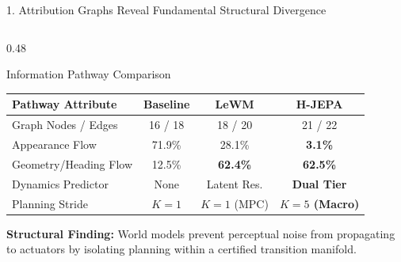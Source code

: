 \documentclass[aspectratio=169, 10pt]{beamer}
\begin{document}
\begin{frame}{1. Attribution Graphs Reveal Fundamental Structural Divergence}
\begin{columns}[T]
    \begin{column}{0.48\textwidth}
      \begin{block}{Information Pathway Comparison}
        \scriptsize
        \centering
        \setlength{\tabcolsep}{3pt}
        \begin{tabular}{lccc}
          \toprule
          \textbf{Pathway Attribute} & \textbf{Baseline} & \textbf{LeWM} & \textbf{H-JEPA} \\
          \midrule
          Graph Nodes / Edges & 16 / 18 & 18 / 20 & 21 / 22 \\
          Appearance Flow & \alert{71.9\%} & 28.1\% & \textbf{3.1\%} \\
          Geometry/Heading Flow & 12.5\% & \textbf{62.4\%} & \textbf{62.5\%} \\
          Dynamics Predictor & None & Latent Res. & \textbf{Dual Tier} \\
          Planning Stride & $K=1$ & $K=1$ (MPC) & \textbf{$K=5$ (Macro)} \\
          \bottomrule
        \end{tabular}
      \end{block}
      \vspace{0.05cm}
      \scriptsize \textbf{Structural Finding:} World models prevent perceptual noise from propagating to actuators by isolating planning within a certified transition manifold.
    \end{column}
  \end{columns}
\end{frame}
\end{document}
